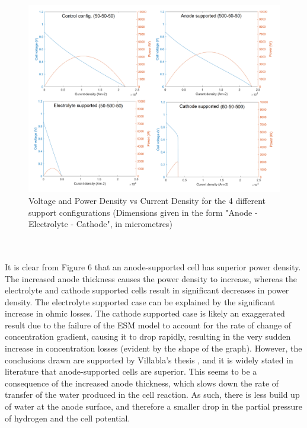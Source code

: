 \documentclass{article}
\begin{document}
    
  \begin{figure}[h]
      \centering
      \includegraphics[scale=0.6]{support_comparison.png}
      \caption{Voltage and Power Density vs Current Density for the 4 different support configurations (Dimensions given in the form "Anode - Electrolyte - Cathode", in micrometres)}
      \label{LMfig:SOFCsupport}
  \end{figure}
  \hspace{1cm}\\
  \hspace{1cm}\\
    It is clear from Figure 6 that an anode-supported cell has superior power density. The increased anode thickness causes the power density to increase, whereas the electrolyte and cathode supported cells result in significant decreases in power density. The electrolyte supported case can be explained by the significant increase in ohmic losses. The cathode supported case is likely an exaggerated result due to the failure of the ESM model to account for the rate of change of concentration gradient, causing it to drop rapidly, resulting in the very sudden increase in concentration losses (evident by the shape of the graph). However, the conclusions drawn are supported by Villabla's thesis \cite{LM2}, and it is widely stated in literature that anode-supported cells are superior. This seems to be a consequence of the increased anode thickness, which slows down the rate of transfer of the water produced in the cell reaction. As such, there is less build up of water at the anode surface, and therefore a smaller drop in the partial pressure of hydrogen and the cell potential.
    \\
    \\
  
\end{document}
